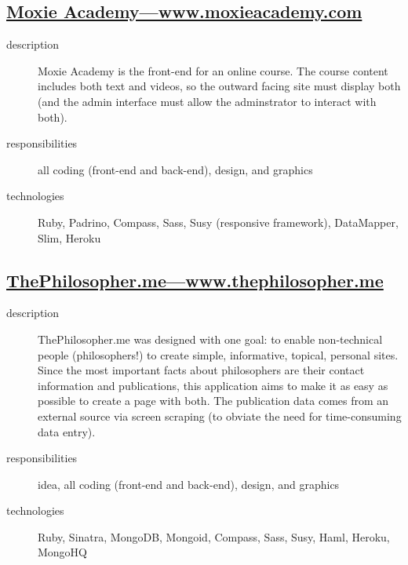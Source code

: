 \documentclass{article}
\begin{document}
\begin{multicols}{2}

\subsection{\href{http://www.moxieacademy.com}{Moxie Academy---www.moxieacademy.com}}
\label{sub:Moxie Academy}

\begin{description}
  \item[description] Moxie Academy is the front-end for an online 
    course.  The course content includes both text and videos, so the 
    outward facing site must display both (and the admin interface 
    must allow the adminstrator to interact with both).
  \item[responsibilities] all coding (front-end and back-end), design, and graphics
  \item[technologies] Ruby, Padrino, Compass, Sass, Susy (responsive framework), DataMapper, Slim, Heroku
\end{description}


\subsection{\href{http://www.thephilosopher.me}
  {ThePhilosopher.me---www.thephilosopher.me}}
\label{sub:ThePhilosopher}

\begin{description}
  \item[description] ThePhilosopher.me was designed with one goal: to 
    enable non-technical people (philosophers!) to create simple, 
    informative, topical, personal sites.  Since the most important 
    facts about philosophers are their contact information and 
    publications, this application aims to make it as easy as possible 
    to create a page with both.  The publication data comes from an 
    external source via screen scraping (to obviate the need for 
    time-consuming data entry).
  \item[responsibilities] idea, all coding (front-end and back-end), 
    design, and graphics
  \item[technologies] Ruby, Sinatra, MongoDB, Mongoid, Compass, Sass, 
    Susy, Haml, Heroku, MongoHQ
\end{description}



\end{multicols}
\end{document}
